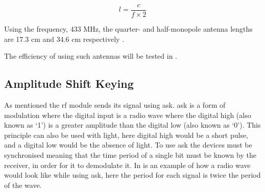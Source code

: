 \begin{equation}
l = \frac{c}{f \times 2}
\end{equation}

\noindent
Using the frequency, 433 MHz, the quarter- and half-monopole antenna lengths are 17.3 cm and 34.6 cm respectively \cite{AntennaLength}.

The efficiency of using such antennas will be tested in .

\subsection{Amplitude Shift Keying}\label{subsub:ask}
As mentioned the \gls{rf} module sends its signal using \gls{ask}.
\gls{ask} is a form of modulation where the digital input is a radio wave where the digital high (also known as \enquote*{1}) is a greater amplitude than the digital low (also known as \enquote*{0}).
This principle can also be used with light, here digital high would be a short pulse, and a digital low would be the absence of light. 
To use \gls{ask} the devices must be synchronised meaning that the time period of a single bit must be known by the receiver, in order for it to demodulate it. 
In  is an example of how a radio wave would look like while using \gls{ask}, here the period for each signal is twice the period of the wave. \cite{ASKnFSK}

